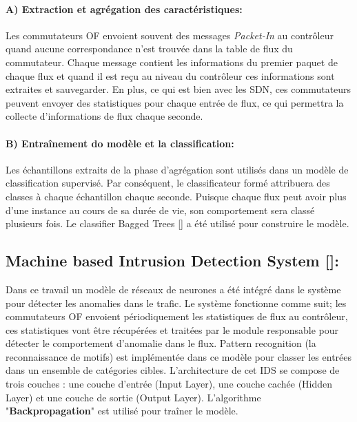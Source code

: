 \paragraph{A) Extraction et agrégation des caractéristiques:\\}
Les commutateurs OF envoient souvent des messages \textit{Packet-In} au contrôleur quand aucune correspondance n’est trouvée dans la table de flux du commutateur. Chaque message contient les informations du premier paquet de chaque flux et quand il est reçu au niveau du contrôleur ces informations sont extraites et sauvegarder. En plus, ce qui est bien avec les SDN, ces commutateurs peuvent envoyer des statistiques pour chaque entrée de flux, ce qui permettra la collecte d'informations de flux chaque seconde. 

\paragraph{B) Entraînement do modèle et la classification:\\}
Les échantillons extraits de la phase d’agrégation sont utilisés dans un modèle de classification supervisé. Par conséquent, le classificateur formé attribuera des classes à chaque échantillon chaque seconde. Puisque chaque flux peut avoir plus d’une instance au cours de sa durée de vie, son comportement sera classé plusieurs fois. Le classifier Bagged Trees [\cite{9}] a été utilisé pour construire le modèle.

\subsection{Machine based Intrusion Detection System [\cite{10}]:}
Dans ce travail un modèle de réseaux de neurones a été intégré dans le système pour détecter les anomalies dans le trafic. Le système fonctionne comme suit; les commutateurs OF envoient périodiquement les statistiques de flux au contrôleur, ces statistiques vont être récupérées et traitées par le module responsable pour détecter le comportement d’anomalie dans le flux. Pattern recognition (la reconnaissance de motifs) est implémentée dans ce modèle pour classer les entrées dans un ensemble de catégories cibles. L’architecture de cet IDS se compose de trois couches : une couche d’entrée (Input Layer), une couche cachée (Hidden Layer) et une couche de sortie (Output Layer). L’algorithme "\textbf{Backpropagation}" est utilisé pour traîner le modèle.

